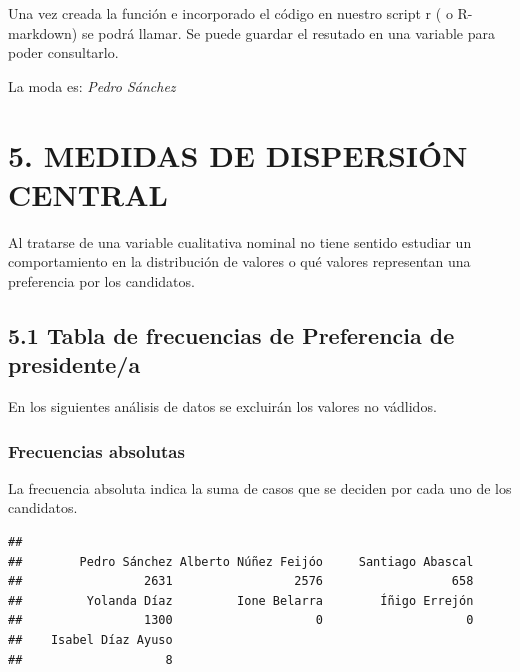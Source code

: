 \documentclass[
]{article}
\newenvironment{Shaded}{\begin{snugshade}}{\end{snugshade}}
\newcommand{\AttributeTok}[1]{\textcolor[rgb]{0.13,0.29,0.53}{#1}}
\newcommand{\FunctionTok}[1]{\textcolor[rgb]{0.13,0.29,0.53}{\textbf{#1}}}
\newcommand{\NormalTok}[1]{#1}
\newcommand{\OtherTok}[1]{\textcolor[rgb]{0.56,0.35,0.01}{#1}}
\newcommand{\SpecialCharTok}[1]{\textcolor[rgb]{0.81,0.36,0.00}{\textbf{#1}}}
\newcommand{\StringTok}[1]{\textcolor[rgb]{0.31,0.60,0.02}{#1}}
\begin{document}
Una vez creada la función e incorporado el código en nuestro script r (
o R-markdown) se podrá llamar. Se puede guardar el resutado en una
variable para poder consultarlo.

\begin{Shaded}
\end{Shaded}

La moda es: \emph{Pedro Sánchez}

\hypertarget{medidas-de-dispersiuxf3n-central}{%
\section{5. MEDIDAS DE DISPERSIÓN
CENTRAL}\label{medidas-de-dispersiuxf3n-central}}

Al tratarse de una variable cualitativa nominal no tiene sentido
estudiar un comportamiento en la distribución de valores o qué valores
representan una preferencia por los candidatos.

\hypertarget{tabla-de-frecuencias-de-preferencia-de-presidentea}{%
\subsection{5.1 Tabla de frecuencias de Preferencia de
presidente/a}\label{tabla-de-frecuencias-de-preferencia-de-presidentea}}

En los siguientes análisis de datos se excluirán los valores no
vádlidos.

\hypertarget{frecuencias-absolutas}{%
\subsubsection{Frecuencias absolutas}\label{frecuencias-absolutas}}

La frecuencia absoluta indica la suma de casos que se deciden por cada
uno de los candidatos.

\begin{Shaded}
\end{Shaded}

\begin{verbatim}
## 
##        Pedro Sánchez Alberto Núñez Feijóo     Santiago Abascal 
##                 2631                 2576                  658 
##         Yolanda Díaz         Ione Belarra        Íñigo Errejón 
##                 1300                    0                    0 
##    Isabel Díaz Ayuso 
##                    8
\end{verbatim}
\end{document}
